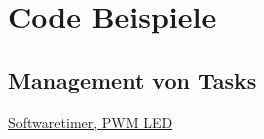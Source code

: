\newpage
\onecolumn

\section{Code Beispiele}

\subsection{Management von Tasks} \label{sec:task_management}



\underline{Softwaretimer, PWM LED}

